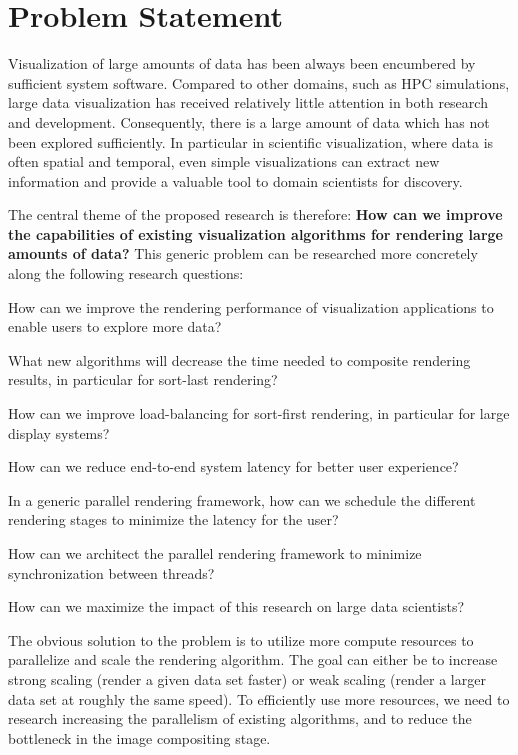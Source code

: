 \section{Problem Statement}

Visualization of large amounts of data has been always been encumbered by
sufficient system software. Compared to other domains, such as HPC simulations,
large data visualization has received relatively little attention in both
research and development. Consequently, there is a large amount of data which
has not been explored sufficiently. In particular in scientific visualization,
where data is often spatial and temporal, even simple visualizations can extract
new information and provide a valuable tool to domain scientists for discovery.

The central theme of the proposed research is therefore: {\bf How can we improve
the capabilities of existing visualization algorithms for rendering large
amounts of data?} This generic problem can be researched more concretely along
the following research questions:
\begin{compactenum}
\item How can we improve the rendering performance of visualization applications to enable users to explore more data?
    \begin{compactenum}
    \item What new algorithms will decrease the time needed to composite rendering results, in particular for sort-last rendering?
    \item How can we improve load-balancing for sort-first rendering, in particular for large display systems?
    \end{compactenum}
\item How can we reduce end-to-end system latency for better user experience?
    \begin{compactenum}
    \item In a generic parallel rendering framework, how can we schedule the different rendering stages to minimize the latency for the user?
    \item How can we architect the parallel rendering framework to minimize synchronization between threads?
    \end{compactenum}
\item How can we maximize the impact of this research on large data scientists?
\end{compactenum}

The obvious solution to the problem is to utilize more compute resources to
parallelize and scale the rendering algorithm. The goal can either be to
increase strong scaling (render a given data set faster) or weak scaling (render
a larger data set at roughly the same speed). To efficiently use more resources,
we need to research increasing the parallelism of existing algorithms, and to
reduce the bottleneck in the image compositing stage.

